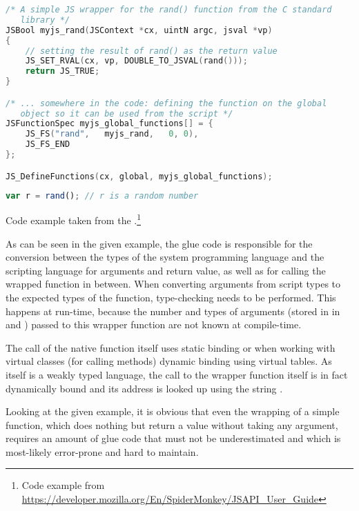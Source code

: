 \SingleSpacing
\begin{lstlisting}[language=C++, caption=Exposing a \myProperName{C} function to \myProperName{SpiderMonkey}]
/* A simple JS wrapper for the rand() function from the C standard 
   library */
JSBool myjs_rand(JSContext *cx, uintN argc, jsval *vp)
{
    // setting the result of rand() as the return value
    JS_SET_RVAL(cx, vp, DOUBLE_TO_JSVAL(rand()));
    return JS_TRUE;
}

/* ... somewhere in the code: defining the function on the global 
   object so it can be used from the script */
JSFunctionSpec myjs_global_functions[] = {
    JS_FS("rand",   myjs_rand,   0, 0),
    JS_FS_END
};

JS_DefineFunctions(cx, global, myjs_global_functions);
\end{lstlisting}
\OnehalfSpacing

\SingleSpacing
\begin{lstlisting}[language=JavaScript, caption=Using a \myProperName{C} function from \myProperName{SpiderMonkey}]
var r = rand();	// r is a random number
\end{lstlisting}
\OnehalfSpacing

Code example taken from the .\footnote{Code example from \url{https://developer.mozilla.org/En/SpiderMonkey/JSAPI_User_Guide}}

As can be seen in the given example, the glue code is responsible for the conversion between the types of the system programming language and the scripting language for arguments and return value, as well as for calling the wrapped function in between. When converting arguments from script types to the expected types of the  function, type-checking needs to be performed. This happens at run-time, because the number and types of arguments (stored in in  and ) passed to this wrapper function are not known at compile-time.

The call of the native function  itself uses static binding or when working with virtual classes (for calling methods) dynamic binding using virtual tables. As  itself is a weakly typed language, the call to the wrapper function  itself is in fact dynamically bound and its address is looked up using the string .

Looking at the given example, it is obvious that even the wrapping of a simple  function, which does nothing but return a  value without taking any argument, requires an amount of glue code that must not be underestimated and which is most-likely error-prone and hard to maintain.

